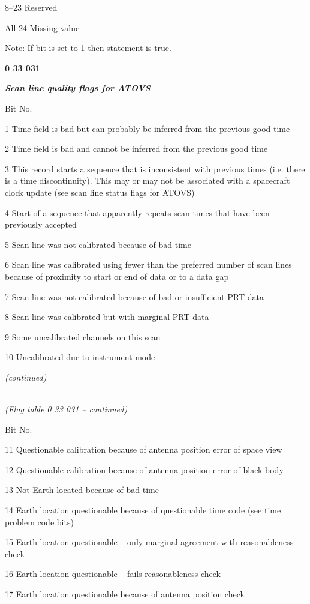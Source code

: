 8--23 Reserved

All 24 Missing value

Note: If bit is set to 1 then statement is true.

\textbf{0 33 031}

\emph{\textbf{Scan line quality flags for ATOVS}}

Bit No.

1 Time field is bad but can probably be inferred from the previous good time

2 Time field is bad and cannot be inferred from the previous good time

3 This record starts a sequence that is inconsistent with previous times (i.e. there is a time discontinuity). This may or may not be associated with a spacecraft clock update (see scan line status flags for ATOVS)

4 Start of a sequence that apparently repeats scan times that have been previously accepted

5 Scan line was not calibrated because of bad time

6 Scan line was calibrated using fewer than the preferred number of scan lines because of proximity to start or end of data or to a data gap

7 Scan line was not calibrated because of bad or insufficient PRT data

8 Scan line was calibrated but with marginal PRT data

9 Some uncalibrated channels on this scan

10 Uncalibrated due to instrument mode

\emph{(continued)}

\emph{\\
(Flag table 0 33 031 -- continued)}

Bit No.

11 Questionable calibration because of antenna position error of space view

12 Questionable calibration because of antenna position error of black body

13 Not Earth located because of bad time

14 Earth location questionable because of questionable time code (see time problem code bits)

15 Earth location questionable -- only marginal agreement with reasonableness check

16 Earth location questionable -- fails reasonableness check

17 Earth location questionable because of antenna position check

